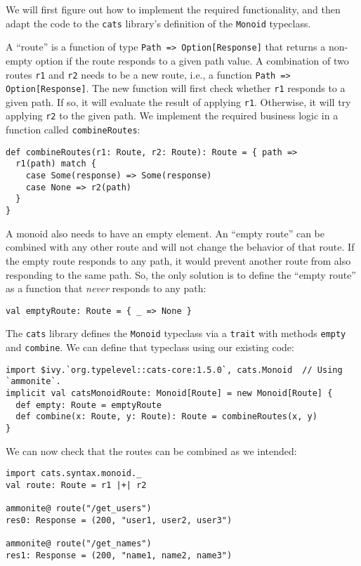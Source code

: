 We will first figure out how to implement the required functionality,
and then adapt the code to the \texttt{cats} library\textsf{'}s definition
of the \lstinline!Monoid! typeclass.

A \textsf{``}route\textsf{''} is a function of type \lstinline!Path => Option[Response]!
that returns a non-empty option if the route responds to a given path
value. A combination of two routes \lstinline!r1! and \lstinline!r2!
needs to be a new route, i.e., a function \lstinline!Path => Option[Response]!.
The new function will first check whether \lstinline!r1! responds
to a given path. If so, it will evaluate the result of applying \lstinline!r1!.
Otherwise, it will try applying \lstinline!r2! to the given path.
We implement the required business logic in a function called \lstinline!combineRoutes!:
\begin{lstlisting}
def combineRoutes(r1: Route, r2: Route): Route = { path =>
  r1(path) match {
    case Some(response) => Some(response)
    case None => r2(path)
  }
}
\end{lstlisting}

A monoid also needs to have an empty element. An \textsf{``}empty route\textsf{''}
can be combined with any other route and will not change the behavior
of that route. If the empty route responds to any path, it would prevent
another route from also responding to the same path. So, the only
solution is to define the \textsf{``}empty route\textsf{''} as a function that \emph{never}
responds to any path:
\begin{lstlisting}
val emptyRoute: Route = { _ => None }
\end{lstlisting}

The \texttt{cats} library defines the \lstinline!Monoid! typeclass
via a \lstinline!trait! with methods \lstinline!empty! and \lstinline!combine!.
We can define that typeclass using our existing code:
\begin{lstlisting}
import $ivy.`org.typelevel::cats-core:1.5.0`, cats.Monoid  // Using `ammonite`.
implicit val catsMonoidRoute: Monoid[Route] = new Monoid[Route] {
  def empty: Route = emptyRoute
  def combine(x: Route, y: Route): Route = combineRoutes(x, y)
}
\end{lstlisting}
We can now check that the routes can be combined as we intended:
\begin{lstlisting}
import cats.syntax.monoid._
val route: Route = r1 |+| r2

ammonite@ route("/get_users")
res0: Response = (200, "user1, user2, user3")

ammonite@ route("/get_names")
res1: Response = (200, "name1, name2, name3")
\end{lstlisting}

